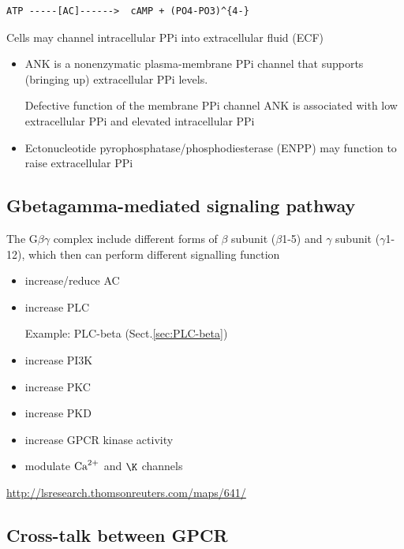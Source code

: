 \begin{verbatim}
ATP -----[AC]------>  cAMP + (PO4-PO3)^{4-}
\end{verbatim}

Cells may channel intracellular PPi into extracellular fluid (ECF)
\begin{itemize}
  \item   ANK is a nonenzymatic plasma-membrane PPi channel that supports
  (bringing up) extracellular PPi levels.
  
  Defective function of the membrane PPi channel ANK is associated with low
  extracellular PPi and elevated intracellular PPi
  
  \item  Ectonucleotide pyrophosphatase/phosphodiesterase (ENPP) may function to
  raise extracellular PPi
    
\end{itemize}

\subsection{Gbetagamma-mediated signaling pathway}
\label{sec:Gbetagamma-mediate-signaling-pathway}

The G$\beta\gamma$ complex include different forms of $\beta$ subunit
($\beta$1-5) and $\gamma$ subunit ($\gamma$1-12), which then can perform
different signalling function

\begin{itemize}
  \item increase/reduce AC
  
  \item increase PLC
  
  Example: PLC-beta (Sect.\ref{sec:PLC-beta})
  
  \item increase PI3K
  
  \item increase PKC
  
  \item increase PKD
  
  \item increase GPCR kinase activity
  
  \item modulate ${\text{Ca}^{2+}}$ and $\K$ channels
\end{itemize}
\url{http://lsresearch.thomsonreuters.com/maps/641/}


\subsection{Cross-talk between GPCR}

